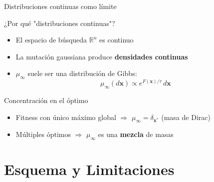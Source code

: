 \documentclass[10pt, aspectratio=169]{beamer}
\begin{document}
\begin{frame}{Distribuciones continuas como límite}
\begin{block}{¿Por qué "distribuciones continuas"?}
\begin{itemize}
    \item El espacio de búsqueda $\mathbb{R}^n$ es continuo
    \item La mutación gaussiana produce \textbf{densidades continuas}
    \item $\mu_\infty$ suele ser una \alert{distribución de Gibbs}:
    \[
    \mu_\infty(d\mathbf{x}) \propto e^{F(\mathbf{x})/\tau} \, d\mathbf{x}
    \]
\end{itemize}
\end{block}

\begin{block}{Concentración en el óptimo}
\begin{itemize}
    \item Fitness con único máximo global $\Rightarrow$ $\mu_\infty = \delta_{\mathbf{x}^*}$ (masa de Dirac)
    \item Múltiples óptimos $\Rightarrow$ $\mu_\infty$ es una \textbf{mezcla} de masas
\end{itemize}
\end{block}
\end{frame}

\section{Esquema y Limitaciones}
\end{document}
